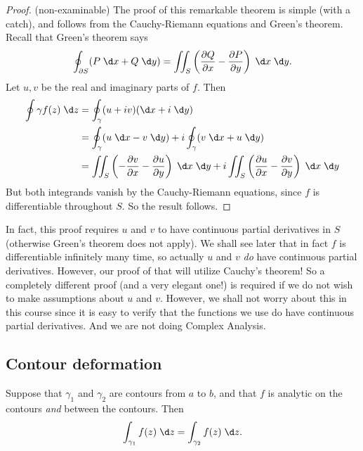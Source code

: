 \documentclass[a4paper]{article}
\begin{document}
\begin{proof}(non-examinable)
  The proof of this remarkable theorem is simple (with a catch), and follows from the Cauchy-Riemann equations and Green's theorem. Recall that Green's theorem says
  \[
    \oint_{\partial S} (P \;\d x + Q\;\d y) = \iint_S \left(\frac{\partial Q}{\partial x} - \frac{\partial P}{\partial y}\right)\;\d x\;\d y.
  \]
  Let $u, v$ be the real and imaginary parts of $f$. Then
  \begin{align*}
    \oint \gamma f(z) \;\d z &= \oint_\gamma (u + iv) (\d x + i\;\d y)\\
    &= \oint_\gamma (u\;\d x - v\;\d y) + i \oint_\gamma (v \;\d x + u \;\d y)\\
    &= \iint_S \left(-\frac{\partial v}{\partial x} - \frac{\partial u}{\partial y}\right)\;\d x\;\d y + i\iint_S \left(\frac{\partial u}{\partial x} - \frac{\partial v}{\partial y}\right)\;\d x \;\d y
  \end{align*}
  But both integrands vanish by the Cauchy-Riemann equations, since $f$ is differentiable throughout $S$. So the result follows.
\end{proof}
In fact, this proof requires $u$ and $v$ to have continuous partial derivatives in $S$ (otherwise Green's theorem does not apply). We shall see later that in fact $f$ is differentiable infinitely many time, so actually $u$ and $v$ \emph{do} have continuous partial derivatives. However, our proof of that will utilize Cauchy's theorem! So a completely different proof (and a very elegant one!) is required if we do not wish to make assumptions about $u$ and $v$. However, we shall not worry about this in this course since it is easy to verify that the functions we use do have continuous partial derivatives. And we are not doing Complex Analysis.

\subsection{Contour deformation}
\begin{prop}
  Suppose that $\gamma_1$ and $\gamma_2$ are contours from $a$ to $b$, and that $f$ is analytic on the contours \emph{and} between the contours. Then
  \[
    \int_{\gamma_1}f(z)\;\d z = \int_{\gamma_2} f(z)\;\d z.
  \]
\end{prop}
\begin{center}
\end{center}
\end{document}
